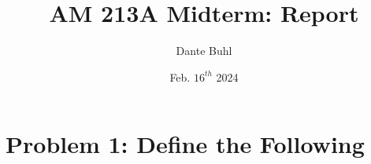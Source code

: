 \documentclass{article}
\title{AM 213A Midterm: Report}
\author{Dante Buhl}
\date{Feb. $16^{th}$ 2024}
\begin{document}
\newcommand{\bs}[1]{\boldsymbol{#1}}
\newcommand{\bmp}[1]{\begin{minipage}{#1\textwidth}}
\newcommand{\emp}{\end{minipage}}
\newcommand{\R}{\mathbb{R}}
\newcommand{\C}{\mathbb{C}}
\newcommand{\N}{\mathcal{N}}
\newcommand{\I}{\mathrm{I}}
\newcommand{\K}{\bs{\mathrm{K}}}
\newcommand{\m}{\bs{\mu}_*}
\newcommand{\s}{\bs{\Sigma}_*}
\newcommand{\dt}{\Delta t}
\newcommand{\tr}[1]{\text{Tr}(#1)}
\newcommand{\Tr}[1]{\text{Tr}(#1)}

\maketitle


\section{Problem 1: Define the Following}
\end{document}
